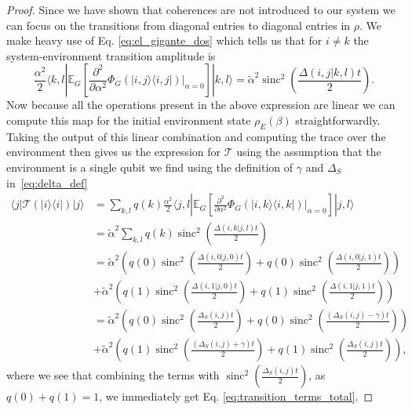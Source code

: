 \documentclass{article}
\newcommand{\ket}[1]{|#1\rangle}
\newcommand{\bra}[1]{\langle #1|}
\newcommand{\ketbra}[2]{| #1\rangle\! \langle #2|}
\DeclareMathOperator{\sinc}{sinc}
\begin{document}
\begin{proof}
    Since we have shown that coherences are not introduced to our system we can focus on the transitions from diagonal entries to diagonal entries in $\rho$. We make heavy use of Eq. \eqref{eq:el_gigante_dos} which tells us that for $i \neq k$ the system-environment transition amplitude is
    \begin{equation}
        \frac{\alpha^2}{2}\bra{k, l} \mathbb{E}_G \left[ \frac{\partial^2}{\partial \alpha^2} \Phi_G(\ketbra{i, j}{i,j}) \big|_{\alpha = 0} \right] \ket{k, l} = \widetilde{\alpha}^2 \sinc^2 \left( \frac{\Delta(i,j | k, l) t}{2} \right). 
    \end{equation}
    Now because all the operations present in the above expression are linear we can compute this map for the initial environment state $\rho_E(\beta)$ straightforwardly. Taking the output of this linear combination and computing the trace over the environment then gives us the expression for $\mathcal{T}$ using the assumption that the environment is a single qubit we find using the definition of $\gamma$ and $\Delta_S$ in~\eqref{eq:delta_def}
    \begin{align}
        \bra{j} \mathcal{T}(\ketbra{i}{i}) \ket{j} &= \sum_{k, l} q(k) \frac{\alpha^2}{2}\bra{j, l} \mathbb{E}_G \left[ \frac{\partial^2}{\partial \alpha^2} \Phi_G(\ketbra{i, k}{i,k}) \big|_{\alpha = 0} \right] \ket{j, l} \\
        &= \widetilde{\alpha}^2 \sum_{k, l} q(k) \sinc^2 \left(\frac{\Delta(i, k | j , l) t}{2} \right) \\
        &= \widetilde{\alpha}^2 \left(q(0) \sinc^2 \left(\frac{\Delta(i, 0 | j , 0) t}{2} \right) + q(0) \sinc^2 \left(\frac{\Delta(i, 0 | j , 1) t}{2} \right) \right) \nonumber \\
        & + \widetilde{\alpha}^2 \left(q(1) \sinc^2 \left(\frac{\Delta(i, 1 | j , 0) t}{2} \right) + q(1) \sinc^2 \left(\frac{\Delta(i, 1 | j , 1) t}{2} \right) \right) \\
        &= \widetilde{\alpha}^2 \left(q(0) \sinc^2 \left(\frac{\Delta_S(i,j) t}{2} \right) + q(0) \sinc^2 \left(\frac{(\Delta_S(i,j) - \gamma) t}{2} \right) \right) \nonumber \\
        & + \widetilde{\alpha}^2 \left(q(1) \sinc^2 \left(\frac{(\Delta_S(i, j) + \gamma) t}{2} \right) + q(1) \sinc^2 \left(\frac{\Delta_S(i,j) t}{2} \right) \right),
    \end{align}
    where we see that combining the terms with $\sinc^2 \left(\frac{\Delta_S(i,j) t}{2} \right)$, as $q(0) + q(1) = 1$, we immediately get Eq. \eqref{eq:transition_terms_total}. 


\end{proof}
\end{document}
